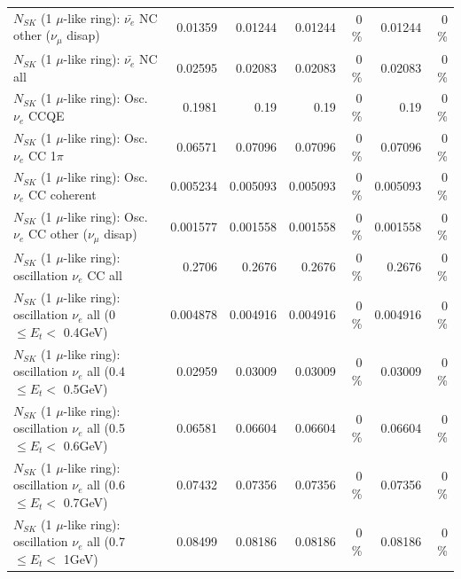 \begin{table}
\begin{tabular}{| l | r | r | r  r | r  r |}
          $N_{SK}$ (1 $\mu$-like ring): $\bar{\nu_e}$ NC other ($\nu_\mu$ disap) &         0.01359 &         0.01244 &         0.01244 &        0 \%  &         0.01244 &        0 \%  \\ 
                            $N_{SK}$ (1 $\mu$-like ring): $\bar{\nu_{e}}$ NC all &         0.02595 &         0.02083 &         0.02083 &        0 \%  &         0.02083 &        0 \%  \\ 
\hline
\hline
\hline
                                 $N_{SK}$ (1 $\mu$-like ring): Osc. $\nu_e$ CCQE &          0.1981 &            0.19 &            0.19 &        0 \%  &            0.19 &        0 \%  \\ 
                            $N_{SK}$ (1 $\mu$-like ring): Osc. $\nu_e$ CC 1$\pi$ &         0.06571 &         0.07096 &         0.07096 &        0 \%  &         0.07096 &        0 \%  \\ 
                          $N_{SK}$ (1 $\mu$-like ring): Osc. $\nu_e$ CC coherent &        0.005234 &        0.005093 &        0.005093 &        0 \%  &        0.005093 &        0 \%  \\ 
           $N_{SK}$ (1 $\mu$-like ring): Osc. $\nu_e$ CC other ($\nu_\mu$ disap) &        0.001577 &        0.001558 &        0.001558 &        0 \%  &        0.001558 &        0 \%  \\ 
                        $N_{SK}$ (1 $\mu$-like ring): oscillation $\nu_e$ CC all &          0.2706 &          0.2676 &          0.2676 &        0 \%  &          0.2676 &        0 \%  \\ 
\hline
$N_{SK}$ (1 $\mu$-like ring): oscillation $\nu_{e}$ all (0 $\leq E_{t} <$ 0.4GeV) &        0.004878 &        0.004916 &        0.004916 &        0 \%  &        0.004916 &        0 \%  \\ 
$N_{SK}$ (1 $\mu$-like ring): oscillation $\nu_{e}$ all (0.4 $\leq E_{t} <$ 0.5GeV) &         0.02959 &         0.03009 &         0.03009 &        0 \%  &         0.03009 &        0 \%  \\ 
$N_{SK}$ (1 $\mu$-like ring): oscillation $\nu_{e}$ all (0.5 $\leq E_{t} <$ 0.6GeV) &         0.06581 &         0.06604 &         0.06604 &        0 \%  &         0.06604 &        0 \%  \\ 
$N_{SK}$ (1 $\mu$-like ring): oscillation $\nu_{e}$ all (0.6 $\leq E_{t} <$ 0.7GeV) &         0.07432 &         0.07356 &         0.07356 &        0 \%  &         0.07356 &        0 \%  \\ 
$N_{SK}$ (1 $\mu$-like ring): oscillation $\nu_{e}$ all (0.7 $\leq E_{t} <$ 1GeV) &         0.08499 &         0.08186 &         0.08186 &        0 \%  &         0.08186 &        0 \%  \\ 

\end{tabular}
\end{table}
